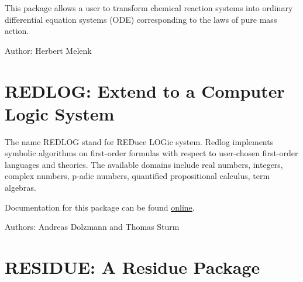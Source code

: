 
This package allows a user to transform chemical reaction systems into
ordinary differential equation systems (ODE) corresponding to the laws of
pure mass action.


Author: Herbert Melenk



\newpage

\section{REDLOG: Extend \REDUCE{} to a Computer Logic System}


The name REDLOG stand for REDuce LOGic system. Redlog implements
symbolic algorithms on first-order formulas with respect to
user-chosen first-order languages and theories. The available domains
include real numbers, integers, complex numbers, p-adic numbers,
quantified propositional calculus, term algebras.

Documentation for this package can be found \href{http://redlog.eu/}{online}.

Authors: Andreas Dolzmann and Thomas Sturm

\newpage
\iffalse
\section{RESIDUE: A Residue Package}

